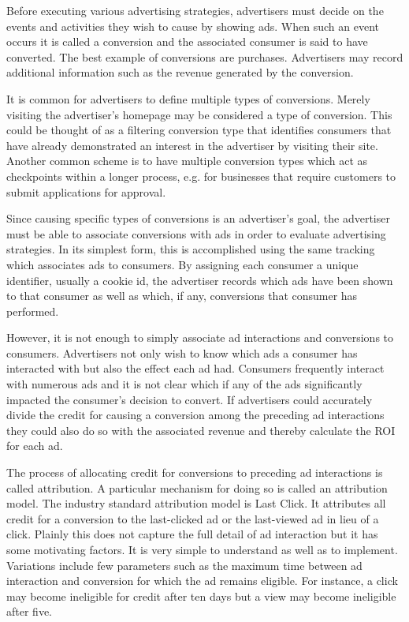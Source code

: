 \documentclass{article}
\begin{document}
Before executing various advertising strategies, advertisers must decide on the events and activities they wish to cause by showing ads. When such an event occurs it is called a conversion and the associated consumer is said to have converted. The best example of conversions are purchases. Advertisers may record additional information such as the revenue generated by the conversion.

It is common for advertisers to define multiple types of conversions. Merely visiting the advertiser's homepage may be considered a type of conversion. This could be thought of as a filtering conversion type that identifies consumers that have already demonstrated an interest in the advertiser by visiting their site. Another common scheme is to have multiple conversion types which act as checkpoints within a longer process, e.g. for businesses that require customers to submit applications for approval.

Since causing specific types of conversions is an advertiser's goal, the advertiser must be able to associate conversions with ads in order to evaluate advertising strategies. In its simplest form, this is accomplished using the same tracking which associates ads to consumers. By assigning each consumer a unique identifier, usually a cookie id, the advertiser records which ads have been shown to that consumer as well as which, if any, conversions that consumer has performed.

However, it is not enough to simply associate ad interactions and conversions to consumers. Advertisers not only wish to know which ads a consumer has interacted with but also the effect each ad had. Consumers frequently interact with numerous ads and it is not clear which if any of the ads significantly impacted the consumer's decision to convert. If advertisers could accurately divide the credit for causing a conversion among the preceding ad interactions they could also do so with the associated revenue and thereby calculate the ROI for each ad.

The process of allocating credit for conversions to preceding ad interactions is called attribution. A particular mechanism for doing so is called an attribution model. The industry standard attribution model is Last Click. It attributes all credit for a conversion to the last-clicked ad or the last-viewed ad in lieu of a click. Plainly this does not capture the full detail of ad interaction but it has some motivating factors. It is very simple to understand as well as to implement. Variations include few parameters such as the maximum time between ad interaction and conversion for which the ad remains eligible. For instance, a click may become ineligible for credit after ten days but a view may become ineligible after five.
\end{document}
